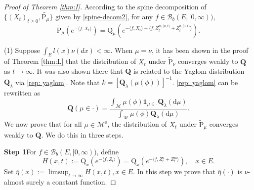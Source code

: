 \documentclass[12pt,a4paper]{amsart}
\numberwithin{equation}{section}
\theoremstyle{plain}
\theoremstyle{definition}
\theoremstyle{remark}
\begin{document}
\begin{proof}[Proof of Theorem \ref{thm:I}]
According to the spine decomposition of $\{(X_t)_{t\geq 0}, \widetilde{\mathrm P_\mu}\}$  given by
\eqref{spine-decom2}, for any
$f\in\mathcal B_b(E,[0,\infty))$,
\[
\widetilde {\mathrm P}_{\mu}\left(e^{-\langle f, X_t\rangle }\right)=\mathrm Q_{\mu}\left(e^{-\langle f, X_t\rangle+\langle f, Z^{{\mathrm m},[0,t)}_t+Z^{{\mathrm n},[0,t)}_t\rangle }\right).
\]

(1) Suppose $\int_El(x)\nu(dx)<\infty$.
When $\mu=\nu$,
it has been shown in the proof of Theorem \ref{thm:L} that the distribution of
$X_t$ under $\widetilde {\mathrm P}_{\nu}$ converges weakly to $\mathbf Q$ as $t\to\infty$.
It was also shown there that $\mathbf Q$ is related to the Yaglom distribution $\mathbf Q_\lambda$ via \eqref{rep: yaglom}.
Note that $k=[\mathbf Q_\lambda(\mu(\phi))]^{-1}$.
\eqref{rep: yaglom} can be rewritten as
\begin{equation}\label{eq size bias}
{\mathbf Q}\left(\mu\in\cdot\right)=
\dfrac{\int_{\mathcal M}\mu(\phi)\mathbf 1_{\mu\in \cdot} \mathbf Q_\lambda(\mathrm d\mu)}{\int_{\mathcal M}\mu(\phi)\mathbf Q_\lambda(\mathrm d\mu)}.
\end{equation}
We now prove that for all $\mu\in\mathcal M^o$, the distribution of $X_t$ under $\widetilde {\mathrm P}_{\mu}$ converges weakly to $\mathbf Q$.  We do this in three steps.

{\bf Step 1}\quad For $f\in\mathcal B_b(E,[0,\infty))$, define
\begin{equation}\label{def: H}
H(x,t):={\mathrm Q}_x\left(e^{-\langle f, Z_{t}\rangle }\right)={\mathrm Q}_x\left(e^{-\langle f, Z^{\mathrm n}_{t} + Z^{\mathrm m}_{t}\rangle }\right),\quad x\in E.
\end{equation}
Set $\overline \eta(x):=\limsup_{t\to\infty}H(x,t), x\in E$.
In this step we prove that
$\overline\eta(\cdot)$ is $\nu$-almost surely a constant function.


\end{proof}
\end{document}
